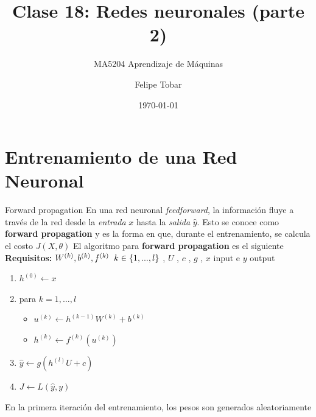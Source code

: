 \documentclass[handout, 9pt]{beamer}
\title{Clase 18: Redes neuronales (parte 2)}
\subtitle{MA5204 Aprendizaje de Máquinas}
\date{\today}
\author{Felipe Tobar}
\institute{Iniciativa de Datos e Inteligencia Artificial\\Universidad de Chile}
\begin{document}
\begin{frame}
  \titlepage
\end{frame}

\section{Entrenamiento de una Red Neuronal}

\begin{frame}{Forward propagation}
En una red neuronal \textit{feedforward}, la información fluye a través de la red desde la \emph{entrada} $x$ hasta la \emph{salida} $\hat{y}$. Esto se conoce como \textbf{forward propagation} y es la forma en que, durante el entrenamiento, se calcula el costo $J(X, \theta)$ \pause
\newline 
El algoritmo para \textbf{forward propagation} es el siguiente 
\newline
\hspace{0.5cm} \textbf{Requisitos: }   $W^{(k)} , b^{(k)} , f^{(k)} \hspace{0.2cm} k \in \{1,...,l\}$ , $U$ , $c$ , $g$ , $x$ input e $y$ output  \pause
\begin{enumerate}
  \item $h^{(0)} \gets x$ \pause
  \item para $k = 1 , \dots , l$
  \begin{itemize}
    \item $u^{(k)} \gets h^{(k-1)}W^{(k)} + b^{(k)}$ \pause
    \item $h^{(k)} \gets f^{(k)}(u^{(k)})$ \pause
  \end{itemize}
  \item $\hat{y} \gets g(h^{(l)}U + c)$ \pause
  \item $J \gets L(\hat{y},y)$ \pause

\end{enumerate}

\begin{observacion}
En la primera iteración del entrenamiento, los pesos son generados aleatoriamente
\end{observacion}

\end{frame}
\end{document}
